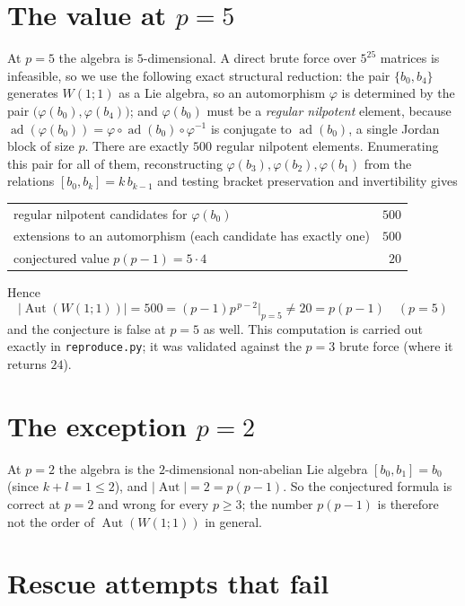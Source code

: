 \documentclass[11pt]{article}
\theoremstyle{definition}
\theoremstyle{remark}
\newcommand{\Aut}{\operatorname{Aut}}
\begin{document}
\section{The value at $p=5$}

At $p=5$ the algebra is $5$-dimensional. A direct brute force over $5^{25}$
matrices is infeasible, so we use the following exact structural reduction: the
pair $\{b_0,b_4\}$ generates $W(1;1)$ as a Lie algebra, so an automorphism
$\varphi$ is determined by the pair
$\bigl(\varphi(b_0),\varphi(b_4)\bigr)$; and $\varphi(b_0)$ must be a
\emph{regular nilpotent} element, because
$\operatorname{ad}(\varphi(b_0)) = \varphi \circ \operatorname{ad}(b_0)\circ
\varphi^{-1}$ is conjugate to $\operatorname{ad}(b_0)$, a single Jordan block of
size $p$. There are exactly $500$ regular nilpotent elements. Enumerating this
pair for all of them, reconstructing
$\varphi(b_3),\varphi(b_2),\varphi(b_1)$ from the relations
$[b_0,b_k]=k\,b_{k-1}$ and testing bracket preservation and invertibility gives
\begin{center}
\begin{tabular}{l r}
\toprule
regular nilpotent candidates for $\varphi(b_0)$ & $500$ \\
extensions to an automorphism (each candidate has exactly one) & $500$ \\
conjectured value $p(p-1) = 5\cdot 4$ & $20$ \\
\bottomrule
\end{tabular}
\end{center}
Hence
\[
\boxed{\;|\Aut(W(1;1))| = 500 = (p-1)p^{\,p-2}\big|_{p=5} \ne 20 = p(p-1)
\quad (p=5)\;}
\]
and the conjecture is false at $p=5$ as well. This computation is carried out
exactly in \texttt{reproduce.py}; it was validated against the $p=3$ brute
force (where it returns $24$).

\section{The exception $p=2$}

At $p=2$ the algebra is the $2$-dimensional non-abelian Lie algebra
$[b_0,b_1]=b_0$ (since $k+l=1\le 2$), and $|\Aut| = 2 = p(p-1)$. So the
conjectured formula is correct at $p=2$ and wrong for every $p\ge 3$; the
number $p(p-1)$ is therefore not the order of $\Aut(W(1;1))$ in general.

\section{Rescue attempts that fail}
\end{document}
